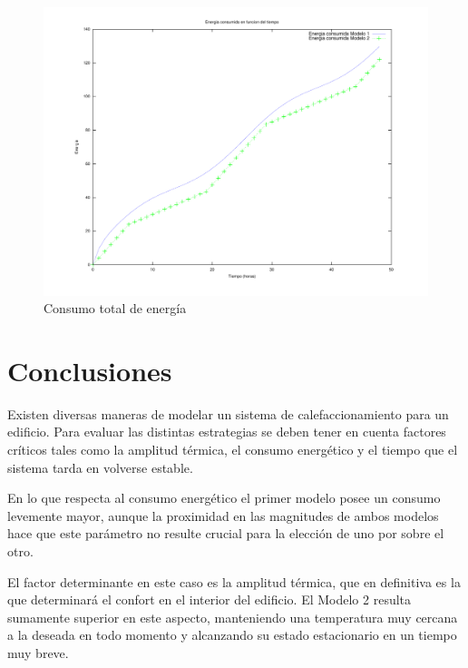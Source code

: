 \documentclass{sig-alternate}
\begin{document}
\begin{figure}[hp]
\label{consumo_energia_total}
\centering
\includegraphics[scale=.8]{graficos/energiatotal}
\caption{Consumo total de energ\'{i}a}
\end{figure}


\section{Conclusiones}\label{conclusiones}

Existen diversas maneras de modelar un sistema de calefaccionamiento para un
edificio. Para evaluar las distintas estrategias se deben tener en cuenta
factores cr\'{i}ticos tales como la amplitud t\'{e}rmica, el consumo
energ\'{e}tico y el tiempo que el sistema tarda en volverse estable.

En lo que respecta al consumo energ\'{e}tico el primer modelo posee un consumo
levemente mayor, aunque la proximidad en las magnitudes de ambos modelos
hace que este par\'{a}metro no resulte crucial para la elecci\'{o}n de uno por sobre
el otro.

El factor determinante en este caso es la amplitud t\'{e}rmica, que en definitiva
es la que determinar\'{a} el confort en el interior del edificio. El Modelo 2
resulta sumamente superior en este aspecto, manteniendo una temperatura muy
cercana a la deseada en todo momento y alcanzando su estado estacionario
en un tiempo muy breve.
\end{document}
